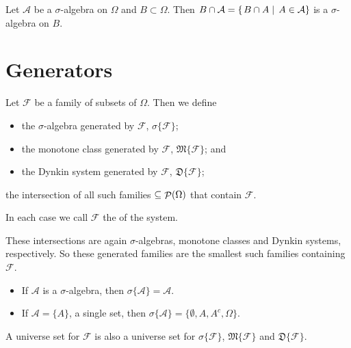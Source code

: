 \begin{lemma}
Let $\mathcal{A}$ be a $\sigma$-algebra on $\Omega$ and $B\subset \Omega$. Then $B\cap \mathcal{A} = \left\{\left. B\cap A \;\right|\; A\in\mathcal{A} \right\}$ is a $\sigma$-algebra on $B$.
\end{lemma}

\section{Generators}
\begin{definition}
Let $\mathcal{F}$ be a family of subsets of $\Omega$. Then we define
\begin{itemize}
\item the $\sigma$-algebra generated by $\mathcal{F}$, $\sigma\{\mathcal{F}\}$;
\item the monotone class generated by $\mathcal{F}$, $\mathfrak{M}\{\mathcal{F}\}$; and
\item the Dynkin system generated by $\mathcal{F}$, $\mathfrak{D}\{\mathcal{F}\}$;
\end{itemize}
the intersection of all such families $\subseteq \mathop{\mathcal{P}}(\Omega)$ that contain $\mathcal{F}$.

In each case we call $\mathcal{F}$ the  of the system.
\end{definition}
These intersections are again $\sigma$-algebras, monotone classes and Dynkin systems, respectively. So these generated families are the smallest such families containing $\mathcal{F}$.

\begin{example}
\begin{itemize}
\item If $\mathcal{A}$ is a $\sigma$-algebra, then $\sigma\{\mathcal{A}\} = \mathcal{A}$.
\item If $\mathcal{A} = \{A\}$, a single set, then $\sigma\{\mathcal{A}\} = \{\emptyset, A,A^c,\Omega\}$.
\end{itemize}
\end{example}

\begin{lemma} \label{lemma:unitGeneratedSets}
A universe set for $\mathcal{F}$ is also a universe set for $\sigma\{\mathcal{F}\}$, $\mathfrak{M}\{\mathcal{F}\}$ and $\mathfrak{D}\{\mathcal{F}\}$.
\end{lemma}

